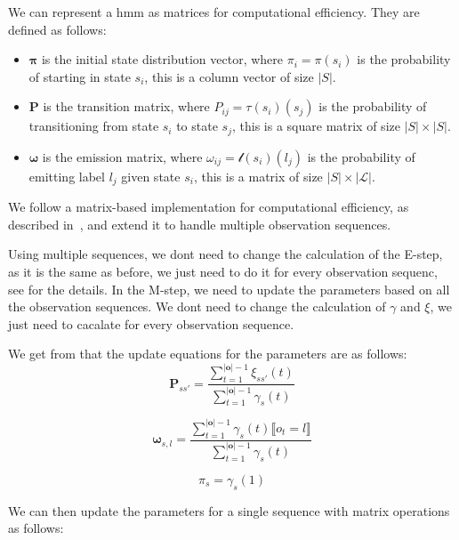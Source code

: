 We can represent a \gls{hmm} as matrices for computational efficiency.
They are defined as follows:
\begin{itemize}
    \item $\pmb{\pi}$ is the initial state distribution vector, where $\pi_i = \pi(s_i)$ is the probability of starting in state $s_i$, this is a column vector of size $|S|$.
    \item $\pmb{P}$ is the transition matrix, where $P_{ij} = \tau(s_i)(s_j)$ is the probability of transitioning from state $s_i$ to state $s_j$, this is a square matrix of size $|S| \times |S|$.
    \item $\pmb{\omega}$ is the emission matrix, where $\omega_{ij} = \mathscr{l}(s_i)(l_j)$ is the probability of emitting label $l_j$ given state $s_i$, this is a matrix of size $|S| \times |\mathcal{L}|$.
\end{itemize}

We follow a matrix-based implementation for computational efficiency, as described in~\cite{aaholmbaum}, and extend it to handle multiple observation sequences.

Using multiple sequences, we dont need to change the calculation of the E-step, as it is the same as before, we just need to do it for every observation sequenc, see \cite{Rabiner89} for the details.
In the M-step, we need to update the parameters based on all the observation sequences.
We dont need to change the calculation of $\gamma$ and $\xi$, we just need to cacalate for every observation sequence.

We get from \cite{aaholmbaum} that the update equations for the parameters are as follows:
\begin{equation}
    \pmb{P}_{s s'} = \frac{\sum_{t = 1}^{|\mathbf{o}|-1} \xi_{ss'}(t)}{\sum_{t = 1}^{|\mathbf{o}|-1} \gamma_s(t)}
    \label{eq:transition-probabilities}
\end{equation}

\begin{equation}
    \pmb{\omega}_{s, l} = \frac{\sum_{t = 1}^{|\mathbf{o}|-1} \gamma_s(t) \lBrack o_t = l \rBrack}{\sum_{t = 1}^{|\mathbf{o}|-1} \gamma_s(t)}
    \label{eq:omega}
\end{equation}

\begin{equation}
    \pi_s = \gamma_s(1)
    \label{eq:initial-probabilities}
\end{equation}

We can then update the parameters for a single sequence with matrix operations as follows:

